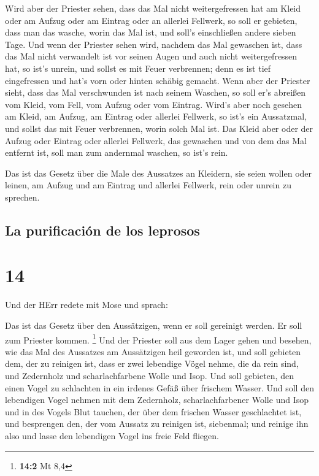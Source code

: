 Wird aber der Priester sehen, dass das Mal nicht
weitergefressen hat am Kleid oder am Aufzug oder am Eintrag oder an
allerlei Fellwerk,  so soll er gebieten, dass man das
wasche, worin das Mal ist, und soll's einschließen andere sieben Tage.
 Und wenn der Priester sehen wird, nachdem das Mal
gewaschen ist, dass das Mal nicht verwandelt ist vor seinen Augen und
auch nicht weitergefressen hat, so ist's unrein, und sollst es mit Feuer
verbrennen; denn es ist tief eingefressen und hat's vorn oder hinten
schäbig gemacht.  Wenn aber der Priester sieht, dass das
Mal verschwunden ist nach seinem Waschen, so soll er's abreißen vom
Kleid, vom Fell, vom Aufzug oder vom Eintrag.  Wird's
aber noch gesehen am Kleid, am Aufzug, am Eintrag oder allerlei
Fellwerk, so ist's ein Aussatzmal, und sollst das mit Feuer verbrennen,
worin solch Mal ist.  Das Kleid aber oder der Aufzug oder
Eintrag oder allerlei Fellwerk, das gewaschen und von dem das Mal
entfernt ist, soll man zum andernmal waschen, so ist's rein.

 Das ist das Gesetz über die Male des Aussatzes an
Kleidern, sie seien wollen oder leinen, am Aufzug und am Eintrag und
allerlei Fellwerk, rein oder unrein zu sprechen.

\hypertarget{la-purificaciuxf3n-de-los-leprosos}{%
\subsection{La purificación de los
leprosos}\label{la-purificaciuxf3n-de-los-leprosos}}

\hypertarget{section-13}{%
\section{14}\label{section-13}}

 Und der HErr redete mit Mose und sprach:

 Das ist das Gesetz über den Aussätzigen, wenn er soll
gereinigt werden. Er soll zum Priester kommen. \footnote{\textbf{14:2}
  Mt 8,4}  Und der Priester soll aus dem Lager gehen und
besehen, wie das Mal des Aussatzes am Aussätzigen heil geworden ist,
 und soll gebieten dem, der zu reinigen ist, dass er zwei
lebendige Vögel nehme, die da rein sind, und Zedernholz und
scharlachfarbene Wolle und Isop.  Und soll gebieten, den
einen Vogel zu schlachten in ein irdenes Gefäß über frischem Wasser.
 Und soll den lebendigen Vogel nehmen mit dem Zedernholz,
scharlachfarbener Wolle und Isop und in des Vogels Blut tauchen, der
über dem frischen Wasser geschlachtet ist,  und besprengen
den, der vom Aussatz zu reinigen ist, siebenmal; und reinige ihn also
und lasse den lebendigen Vogel ins freie Feld fliegen.

